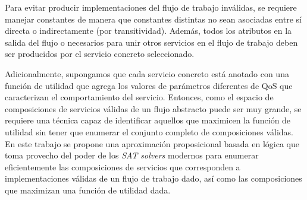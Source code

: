 Para evitar producir implementaciones del flujo de trabajo inválidas, se
requiere manejar constantes de manera que constantes distintas no sean asociadas
entre sí directa o indirectamente (por transitividad). Además, todos los
atributos en la salida del flujo o necesarios para unir otros servicios en el
flujo de trabajo deben ser producidos por el servicio concreto seleccionado.

Adicionalmente, supongamos que cada servicio concreto está anotado con una
función de utilidad que agrega los valores de parámetros diferentes de QoS que
caracterizan el comportamiento del servicio. Entonces, como el espacio de
composiciones de servicios válidas de un flujo abstracto puede ser muy grande,
se requiere una técnica capaz de identificar aquellos que maximicen la función
de utilidad sin tener que enumerar el conjunto completo de composiciones
válidas. En este trabajo se propone una aproximación proposicional basada en
lógica que toma provecho del poder de los \emph{SAT solvers} modernos para
enumerar eficientemente las composiciones de servicios que corresponden a
implementaciones válidas de un flujo de trabajo dado, así como las composiciones
que maximizan una función de utilidad dada.
